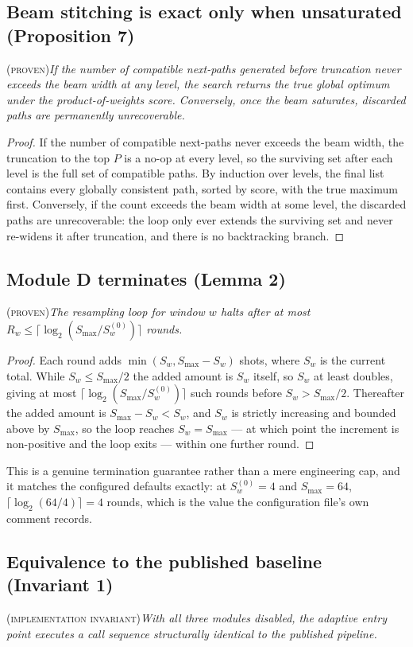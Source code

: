 \documentclass[preprint,11pt]{elsarticle}
\newcommand{\PROVEN}{\textsc{(proven)}}
\newcommand{\INVAR}{\textsc{(implementation invariant)}}
\newcommand{\Smax}{S_{\max}}
\begin{document}
\subsection{Beam stitching is exact only when unsaturated (Proposition 7)}
\PROVEN{}\quad\textit{If the number of compatible next-paths generated
before truncation never exceeds the beam width at any level, the search
returns the true global optimum under the product-of-weights score.
Conversely, once the beam saturates, discarded paths are permanently
unrecoverable.}

\begin{proof}
If the number of compatible next-paths never exceeds the beam width, the
truncation to the top $P$ is a no-op at every level, so the surviving set
after each level is the full set of compatible paths. By induction over
levels, the final list contains every globally consistent path, sorted by
score, with the true maximum first. Conversely, if the count exceeds the
beam width at some level, the discarded paths are unrecoverable: the loop
only ever extends the surviving set and never re-widens it after
truncation, and there is no backtracking branch.
\end{proof}

\subsection{Module D terminates (Lemma 2)}
\PROVEN{}\quad\textit{The resampling loop for window $w$ halts after at
most $R_w\le\lceil\log_2(\Smax/S_w^{(0)})\rceil$ rounds.}

\begin{proof}
Each round adds $\min(S_w,\Smax-S_w)$ shots, where $S_w$ is the current
total. While $S_w\le\Smax/2$ the added amount is $S_w$ itself, so $S_w$
at least doubles, giving at most $\lceil\log_2(\Smax/S_w^{(0)})\rceil$
such rounds before $S_w>\Smax/2$. Thereafter the added amount is
$\Smax-S_w<S_w$, and $S_w$ is strictly increasing and bounded above by
$\Smax$, so the loop reaches $S_w=\Smax$ --- at which point the increment
is non-positive and the loop exits --- within one further round.
\end{proof}

\noindent
This is a genuine termination guarantee rather than a mere engineering
cap, and it matches the configured defaults exactly: at $S_w^{(0)}=4$ and
$\Smax=64$, $\lceil\log_2(64/4)\rceil=4$ rounds, which is the value the
configuration file's own comment records.

\subsection{Equivalence to the published baseline (Invariant 1)}
\INVAR{}\quad\textit{With all three modules disabled, the adaptive entry
point executes a call sequence structurally identical to the published
pipeline.}
\end{document}
